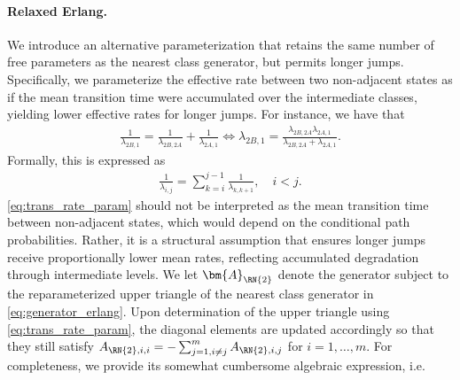 \paragraph{Relaxed Erlang.} 
We introduce an alternative parameterization that retains the same number of free parameters as the nearest class generator, but permits longer jumps. %
Specifically, we parameterize the effective rate between two non-adjacent states as if the mean transition time were accumulated over the intermediate classes, yielding lower effective rates for longer jumps.
For instance, we have that
\begin{align*}
    \frac{1}{\lambda_{2B, 1}} = \frac{1}{\lambda_{2B, 2A}} + \frac{1}{\lambda_{2A, 1}}
    \iff \lambda_{2B,1} = \frac{\lambda_{2B, 2A} \lambda_{2A, 1}}{\lambda_{2B, 2A} + \lambda_{2A, 1}}. 
\end{align*}
Formally, this is expressed as
\begin{align}
    \frac{1}{\lambda_{i,j}} = \sum_{k = i}^{j-1} \frac{1}{\lambda_{k,k+1}}, \quad i < j. \label{eq:trans_rate_param}
\end{align}
\cref{eq:trans_rate_param} should not be interpreted as the mean transition time between non-adjacent states, which would depend on the conditional path probabilities. Rather, it is a structural assumption that ensures longer jumps receive proportionally lower mean rates, reflecting accumulated degradation through intermediate levels.
We let $\bm{A}_{\RN{2}}$ denote the generator subject to the reparameterized upper triangle of the nearest class generator in \cref{eq:generator_erlang}.
Upon determination of the upper triangle using \cref{eq:trans_rate_param}, the diagonal elements are updated accordingly so that they still satisfy $A_{\RN{2},i,i}= -\sum_{j=1, i \neq j}^m A_{\RN{2},i,j}$ for $i = 1, \dots, m$. For completeness, we provide its somewhat cumbersome algebraic expression, i.e.
